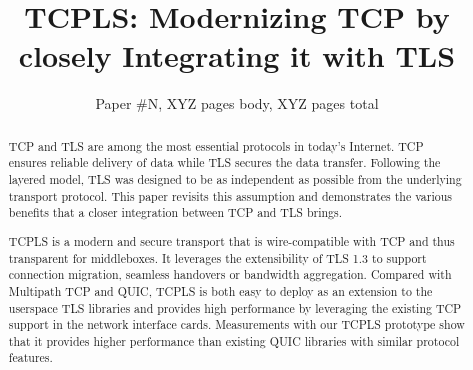 \documentclass[sigconf]{acmart}
\begin{document}
\title{TCPLS: Modernizing TCP by closely Integrating it with TLS}

\author{Paper \#N, XYZ pages body, XYZ pages total}

\renewcommand{\shortauthors}{X.et al.}


\begin{abstract}
  TCP and TLS are among the most essential protocols in today's Internet. TCP ensures reliable delivery of data while TLS secures the data transfer. Following the layered model, TLS was designed to be as independent as possible from the underlying transport protocol. This paper revisits this assumption and demonstrates the various benefits that a closer integration between TCP and TLS brings.

  TCPLS is a modern and secure transport that is wire-compatible with TCP and thus transparent for middleboxes. It leverages the extensibility of TLS 1.3 to support connection migration, seamless handovers or bandwidth aggregation. Compared with Multipath TCP and QUIC, TCPLS is both easy to deploy as an extension to the userspace TLS libraries and provides high performance by leveraging the existing TCP support in the network interface cards. Measurements with our TCPLS prototype show that it provides higher performance than existing QUIC libraries with similar protocol features.

\end{abstract}
\maketitle





\end{document}
